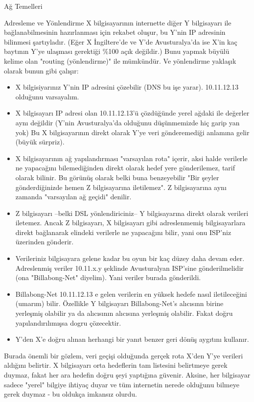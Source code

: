 \begin{section}{Ağ Temelleri}
\begin{subsection}{Adresleme ve Yönlendirme}
X bilgisayarının internette diğer Y bilgisayarı ile bağlanabilmesinin hazırlanması için rekabet oluşur, bu Y'nin IP adresinin bilinmesi şartıyladır. (Eğer X İngiltere'de ve Y'de Avusturalya'da ise X'in kaç baytının Y'ye ulaşması gerektiği \%100 açık değildir.) Bunu yapmak büyülü kelime olan "routing (yönlendirme)" ile mümkündür. Ve yönlendirme yaklaşık olarak bunun gibi çalışır:
\begin{itemize}
\item X bilgisiyarınız Y'nin IP adresini çözebilir (DNS bu işe yarar). 10.11.12.13 olduğunu varsayalım.
\item X bilgisayarı IP adresi olan 10.11.12.13'ü çözdüğünde yerel ağdaki ile değerler aynı değildir (Y'nin Avusturalya'da olduğunu düşünmemizde hiç garip yan yok)
 Bu X bilgisayarının direkt olarak Y'ye veri gönderemediği anlamına gelir (büyük sürpriz).
\item X bilgisayarının ağ yapılandırması "varsayılan rota" içerir, aksi halde verilerle ne yapacağını bilemediğinden direkt olarak hedef yere gönderilemez, tarif olarak bilinir. Bu görünüş olarak belki buna benzeyebilir "Bir şeyler gönderdiğinizde hemen Z bilgisayarına iletilemez". Z bilgisayarına aynı zamanda "varsayılan ağ geçidi" denilir.
\item Z bilgisayarı --belki DSL yönlendiriciniz-- Y bilgisayarına direkt olarak verileri iletemez. Ancak Z bilgisayarı, X bilgisayarı gibi adreslenmemiş bilgisayarlara direkt bağlanarak elindeki verilerle ne yapacağını bilir, yani onu ISP'niz üzerinden gönderir.
\item Verileriniz bilgisayara gelene kadar bu oyun bir kaç düzey daha devam eder. Adreslenmiş veriler 10.11.x.y şeklinde  Avusturalyan ISP'sine gönderilmelidir (ona "Billabong-Net" diyelim). Yani veriler burada gönderildi.
\item Billabong-Net 10.11.12.13 e gelen verilerin en yüksek hedefe nasıl iletileceğini (umarım) bilir. Özellikle Y bilgisayarı Billabong-Net's alıcısınn birine yerleşmiş olabilir ya da alıcısının alıcısına yerleşmiş olabilir. Fakat doğru yapılandırılımışsa dogru çözecektir.
\item Y'den X'e doğru alınan herhangi bir yanıt benzer geri dönüş aygıtını kullanır.
\end{itemize}

Burada önemli bir gözlem, veri geçişi olduğunda gerçek rota X'den Y'ye verileri aldığını belirtir. X bilgisayarı orta hedeflerin tam listesini belirtmeye gerek duymaz, fakat her ara hedefin doğru şeyi yaptığına güvenir. Aksine, her bilgisayar sadece "yerel" bilgiye ihtiyaç duyar ve tüm internetin nerede olduğunu bilmeye gerek duymaz - bu oldukça imkansız olurdu.


\end{subsection}
\end{section}
